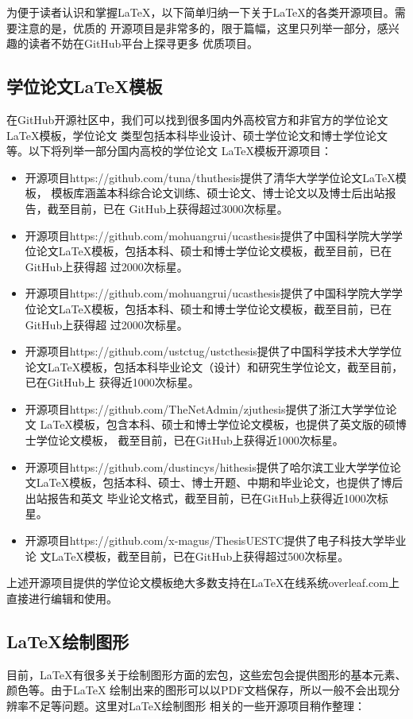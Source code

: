 为便于读者认识和掌握LaTeX，以下简单归纳一下关于LaTeX的各类开源项目。需要注意的是，优质的
开源项目是非常多的，限于篇幅，这里只列举一部分，感兴趣的读者不妨在GitHub平台上探寻更多
优质项目。

\subsection{学位论文\LaTeX 模板}
在GitHub开源社区中，我们可以找到很多国内外高校官方和非官方的学位论文LaTeX模板，学位论文
类型包括本科毕业设计、硕士学位论文和博士学位论文等。以下将列举一部分国内高校的学位论文
LaTeX模板开源项目：
\begin{itemize}
    \item 开源项目https://github.com/tuna/thuthesis提供了清华大学学位论文LaTeX模板，
          模板库涵盖本科综合论文训练、硕士论文、博士论文以及博士后出站报告，截至目前，已在
          GitHub上获得超过3000次标星。
    \item 开源项目https://github.com/mohuangrui/ucasthesis提供了中国科学院大学学
          位论文LaTeX模板，包括本科、硕士和博士学位论文模板，截至目前，已在GitHub上获得超
          过2000次标星。
    \item 开源项目https://github.com/mohuangrui/ucasthesis提供了中国科学院大学学
          位论文LaTeX模板，包括本科、硕士和博士学位论文模板，截至目前，已在GitHub上获得超
          过2000次标星。
    \item 开源项目https://github.com/ustctug/ustcthesis提供了中国科学技术大学学位
          论文LaTeX模板，包括本科毕业论文（设计）和研究生学位论文，截至目前，已在GitHub上
          获得近1000次标星。
    \item 开源项目https://github.com/TheNetAdmin/zjuthesis提供了浙江大学学位论文
          LaTeX模板，包含本科、硕士和博士学位论文模板，也提供了英文版的硕博士学位论文模板，
          截至目前，已在GitHub上获得近1000次标星。
    \item 开源项目https://github.com/dustincys/hithesis提供了哈尔滨工业大学学位论
          文LaTeX模板，包括本科、硕士、博士开题、中期和毕业论文，也提供了博后出站报告和英文
          毕业论文格式，截至目前，已在GitHub上获得近1000次标星。
    \item 开源项目https://github.com/x-magus/ThesisUESTC提供了电子科技大学毕业论
          文LaTeX模板，截至目前，已在GitHub上获得超过500次标星。
\end{itemize}

上述开源项目提供的学位论文模板绝大多数支持在LaTeX在线系统overleaf.com上直接进行编辑和使用。

\subsection{\LaTeX 绘制图形}
目前，LaTeX有很多关于绘制图形方面的宏包，这些宏包会提供图形的基本元素、颜色等。由于LaTeX
绘制出来的图形可以以PDF文档保存，所以一般不会出现分辨率不足等问题。这里对LaTeX绘制图形
相关的一些开源项目稍作整理：

